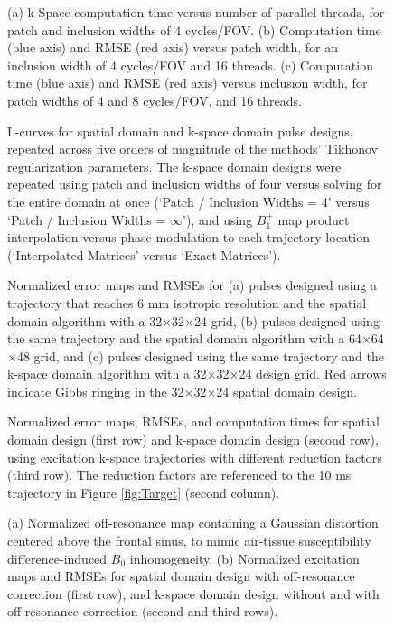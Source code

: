 \documentclass[11pt]{article}
\begin{document}
\begin{figure}[!h]
	\centering
	\caption{(a) k-Space computation time versus number of parallel threads, for patch and inclusion widths of 4 cycles/FOV. 
	(b) Computation time (blue axis) and RMSE (red axis) versus patch width, for an inclusion width of 4 cycles/FOV and 16 threads. 
	(c) Computation time (blue axis) and RMSE (red axis) versus inclusion width, for patch widths of 4 and 8 cycles/FOV, and 16 threads.}
	\label{fig:ComputationTime}
\end{figure}

\begin{figure}[!h]
	\centering
	\caption{L-curves for spatial domain and k-space domain pulse designs, 
	repeated across five orders of magnitude of the methods' Tikhonov regularization parameters.
	The k-space domain designs were repeated using patch and inclusion widths of four versus solving for the entire domain at once (`Patch / Inclusion Widths = 4' versus `Patch / Inclusion Widths = $\infty$'),
	and using $B_1^+$ map product interpolation versus phase modulation to each trajectory location (`Interpolated Matrices' versus
	`Exact Matrices').}
	\label{fig:LCurves}
\end{figure}


\begin{figure}[!h]
	\centering
	\caption{Normalized error maps and RMSEs for 
	(a) pulses designed using a trajectory that reaches 6 mm isotropic resolution
	and the spatial domain algorithm with a 32$\times$32$\times$24 grid, 
	(b) pulses designed using the same trajectory and the spatial domain algorithm with a 64$\times$64$\times$48 grid,  
	and (c) pulses designed using the same trajectory and the k-space domain algorithm with a 32$\times$32$\times$24 design grid. 
	Red arrows indicate Gibbs ringing in the 32$\times$32$\times$24 spatial domain design.}
	\label{fig:GibbsRing}
\end{figure}


\begin{figure}[!h]
	\centering
	\caption{Normalized error maps, RMSEs, and computation times 
	for spatial domain design (first row) and k-space domain design (second row), 
	using excitation k-space trajectories with different reduction factors (third row).
	The reduction factors are referenced to the 10 ms trajectory in Figure \ref{fig:Target} (second column).}
	\label{fig:kspace_PTX_Acceleration}
\end{figure}


\begin{figure}[!h]
	\centering
	\caption{
	(a) Normalized off-resonance map containing a Gaussian distortion centered above the frontal sinus, 
	to mimic air-tissue susceptibility difference-induced $B_0$ inhomogeneity.
	(b) Normalized excitation maps and RMSEs for spatial domain design with off-resonance correction (first row), 
	and k-space domain design without and with off-resonance correction (second and third rows).}
	\label{fig:kspace_PTX_B0}
\end{figure}
\end{document}

